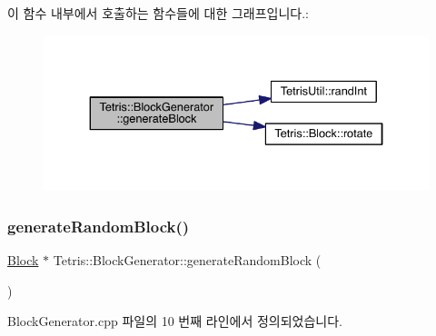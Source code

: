 이 함수 내부에서 호출하는 함수들에 대한 그래프입니다.\+:
\nopagebreak
\begin{figure}[H]
\begin{center}
\leavevmode
\includegraphics[width=334pt]{d3/d50/class_tetris_1_1_block_generator_a584fde2bfe1cdd4505bd905befd73d21_cgraph}
\end{center}
\end{figure}
\mbox{\label{class_tetris_1_1_block_generator_a10dfe1467d40437ad41c5ae76437ad78}} 
\subsubsection{\texorpdfstring{generate\+Random\+Block()}{generateRandomBlock()}\hspace{0.1cm}{\footnotesize\ttfamily [1/2]}}
{\footnotesize\ttfamily \hyperlink{class_tetris_1_1_block}{Block} $\ast$ Tetris\+::\+Block\+Generator\+::generate\+Random\+Block (\begin{DoxyParamCaption}{ }\end{DoxyParamCaption})}



Block\+Generator.\+cpp 파일의 10 번째 라인에서 정의되었습니다.


